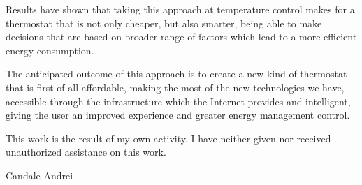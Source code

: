 \qquad Results have shown that taking this approach at temperature control makes for a thermostat that is not
only cheaper, but also smarter, being able to make decisions that are based on broader range of factors which
lead to a more efficient energy consumption.

\qquad The anticipated outcome of this approach is to create a new kind of
thermostat that is first of all affordable, making the most of the new technologies we have, accessible through
the infrastructure which the Internet provides and intelligent, giving the user an improved experience and
greater energy management control.

\qquad This work is the result of my own activity. I have neither given nor received unauthorized
assistance on this work.

\begin{flushright}
Candale Andrei
\end{flushright}


\normalsize
